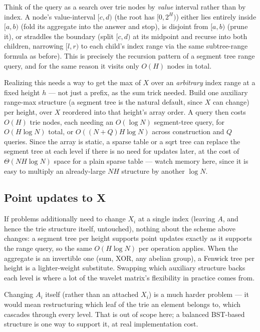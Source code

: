 \documentclass[11pt]{article}
\begin{document}
Think of the query as a search over trie nodes by \emph{value} interval
rather than by index. A node's value-interval $[c, d)$ (the root has
$[0, 2^H)$) either lies entirely inside $[a, b)$ (fold its aggregate into
the answer and stop), is disjoint from $[a, b)$ (prune it), or straddles the
boundary (split $[c,d)$ at its midpoint and recurse into both children,
narrowing $[l, r)$ to each child's index range via the same subtree-range
formula as before). This is precisely the recursion pattern of a segment
tree range query, and for the same reason it visits only $O(H)$ nodes in
total.

Realizing this needs a way to get the max of $X$ over an \emph{arbitrary}
index range at a fixed height $h$ --- not just a prefix, as the sum
trick needed. Build one auxiliary range-max structure (a segment tree
is the natural default, since $X$ can change) per height, over $X$
reordered into that height's array order. A query then costs $O(H)$ trie
nodes, each needing an $O(\log N)$ segment-tree query, for
$O(H \log N)$ total, or $O((N + Q)H \log N)$ across construction and $Q$
queries. Since the array is static, a sparse table or a sqrt tree can
replace the segment tree at each level if there is no need for updates
later, at the cost of $\Theta(NH\log N)$ space for a plain sparse table ---
watch memory here, since it is easy to multiply an already-large $NH$
structure by another $\log N$.

\subsection{Point updates to X}
If problems additionally need to change $X_i$ at a single index (leaving
$A$, and hence the trie structure itself, untouched), nothing about the
scheme above changes: a segment tree per height supports point updates
exactly as it supports the range query, so the same $O(H \log N)$ per
operation applies. When the aggregate is an invertible one (sum, XOR, any
abelian group), a Fenwick tree per height is a lighter-weight
substitute. Swapping which auxiliary structure backs each level is where
a lot of the wavelet matrix's flexibility in practice comes from.

\begin{notebox}
Changing $A_i$ itself (rather than an attached $X_i$) is a much harder
problem --- it would mean restructuring which leaf of the trie an element
belongs to, which cascades through every level. That is out of scope here;
a balanced BST-based structure is one way to support it, at real
implementation cost.
\end{notebox}
\end{document}
